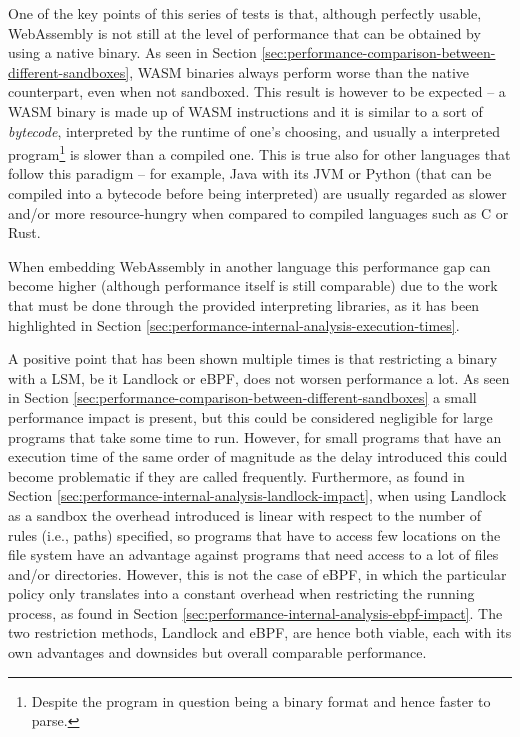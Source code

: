 One of the key points of this series of tests is that, although perfectly usable,
WebAssembly is not still at the level of performance that can be obtained by using a native binary.
As seen in Section \ref{sec:performance-comparison-between-different-sandboxes}, WASM binaries
always perform worse than the native counterpart, even when not sandboxed.
This result is however to be expected -- a WASM binary is made up of WASM instructions and
it is similar to a sort of \textit{bytecode}, interpreted by the runtime of one's choosing,
and usually a interpreted program\footnote{Despite the program in question being a binary format and hence faster to parse.}
is slower than a compiled one.
This is true also for other languages that follow this paradigm -- for example, Java with its JVM
or Python (that can be compiled into a bytecode before being interpreted) are usually regarded as
slower and/or more resource-hungry when compared to compiled languages such as C or Rust.

When embedding WebAssembly in another language this performance gap can become higher
(although performance itself is still comparable) due to
the work that must be done through the provided interpreting libraries, as it has been
highlighted in Section \ref{sec:performance-internal-analysis-execution-times}. 

A positive point that has been shown multiple times is that restricting a binary
with a LSM, be it Landlock or eBPF, does not worsen performance a lot.
As seen in Section \ref{sec:performance-comparison-between-different-sandboxes} a small
performance impact is present, but this could be considered negligible for large programs that take
some time to run. However, for small programs that have an execution time of the same order of magnitude
as the delay introduced this could become problematic if they are called frequently.
Furthermore, as found in Section \ref{sec:performance-internal-analysis-landlock-impact}, when using Landlock
as a sandbox the overhead introduced is linear with respect to the number of rules (i.e., paths) specified,
so programs that have to access few locations on the file system have an advantage against programs that need
access to a lot of files and/or directories.
However, this is not the case of eBPF, in which the particular policy only translates into a constant overhead
when restricting the running process, as found in Section \ref{sec:performance-internal-analysis-ebpf-impact}.
The two restriction methods, Landlock and eBPF, are hence both viable, each with its own advantages and downsides
but overall comparable performance.